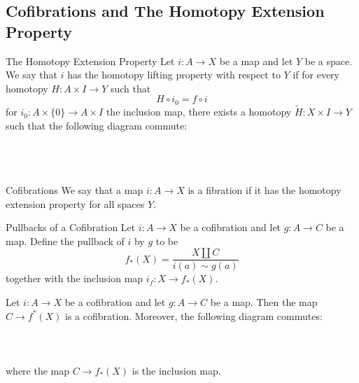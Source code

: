 \documentclass[a4paper]{article}
\begin{document}
\subsection{Cofibrations and The Homotopy Extension Property}
\begin{defn}{The Homotopy Extension Property}{} Let $i:A\to X$ be a map and let $Y$ be a space. We say that $i$ has the homotopy lifting property with respect to $Y$ if for every homotopy $H:A\times I\to Y$ such that $$H\circ i_0=f\circ i$$ for $i_0:A\times\{0\}\to A\times I$ the inclusion map, there exists a homotopy $\widetilde{H}:X\times I\to Y$ such that the following diagram commute: \\~\\
\\~\\
\end{defn}

\begin{defn}{Cofibrations}{} We say that a map $i:A\to X$ is a fibration if it has the homotopy extension property for all spaces $Y$. 
\end{defn}

\begin{defn}{Pullbacks of a Cofibration}{} Let $i:A\to X$ be a cofibration and let $g:A\to C$ be a map. Define the pullback of $i$ by $g$ to be $$f_\ast(X)=\frac{X\amalg C}{i(a)\sim g(a)}$$ together with the inclusion map $i_f:X\to f_\ast(X)$. 
\end{defn}

\begin{prp}{}{} Let $i:A\to X$ be a cofibration and let $g:A\to C$ be a map. Then the map $C\to f^\ast(X)$ is a cofibration. Moreover, the following diagram commutes: \\~\\
\\~\\
where the map $C\to f_\ast(X)$ is the inclusion map. 
\end{prp}
\end{document}
